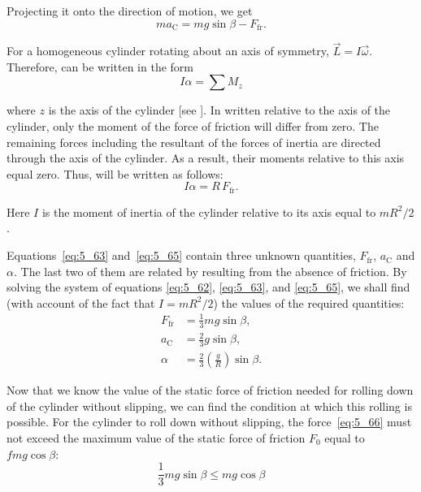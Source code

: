 \noindent
Projecting it onto the direction of motion, we get
\begin{equation}\label{eq:5_63}
	ma_{\text{C}} = mg\sin\beta - F_{\text{fr}}.
\end{equation}

For a homogeneous cylinder rotating about an axis of symmetry, $\vec{L}=I\vec{\omega}$. Therefore,  can be written in the form
\begin{equation}\label{eq:5_64}
	I\alpha = \sum M_z
\end{equation}

\noindent
where $z$ is the axis of the cylinder [see ]. In  written relative to the axis of the cylinder, only the moment of the force of friction will differ from zero. The remaining forces including the resultant of the forces of inertia are directed through the axis of the cylinder. As a result, their moments relative to this axis equal zero. Thus,  will be written as follows:
\begin{equation}\label{eq:5_65}
	I\alpha = R\,F_{\text{fr}}.
\end{equation}

\noindent
Here $I$ is the moment of inertia of the cylinder relative to its axis equal to $mR^2/2$.

Equations~\eqref{eq:5_63} and~\eqref{eq:5_65} contain three unknown quantities, $F_{\text{fr}}$, $a_{\text{C}}$ and $\alpha$. The last two of them are related by  resulting from the absence of friction. By solving the system of equations \eqref{eq:5_62}, \eqref{eq:5_63}, and \eqref{eq:5_65}, we shall find (with account of the fact that $I=mR^2/2$) the values of the required quantities:
\begin{align}
	F_{\text{fr}} &= \frac{1}{3} m g \sin\beta, \label{eq:5_66}\\
	a_{\text{C}} &= \frac{2}{3} g \sin\beta, \label{eq:5_67}\\
	\alpha &= \frac{2}{3}\left(\frac{g}{R}\right)\sin\beta. \label{eq:5_68}
\end{align}

Now that we know the value of the static force of friction needed for rolling down of the cylinder without slipping, we can find the condition at which this rolling is possible. For the cylinder to roll down without slipping, the force~\eqref{eq:5_66} must not exceed the maximum value of the static force of friction $F_0$ equal to $fmg\cos\beta$:
\begin{equation*}
	\frac{1}{3} mg\sin\beta \leqslant mg\cos\beta
\end{equation*}

